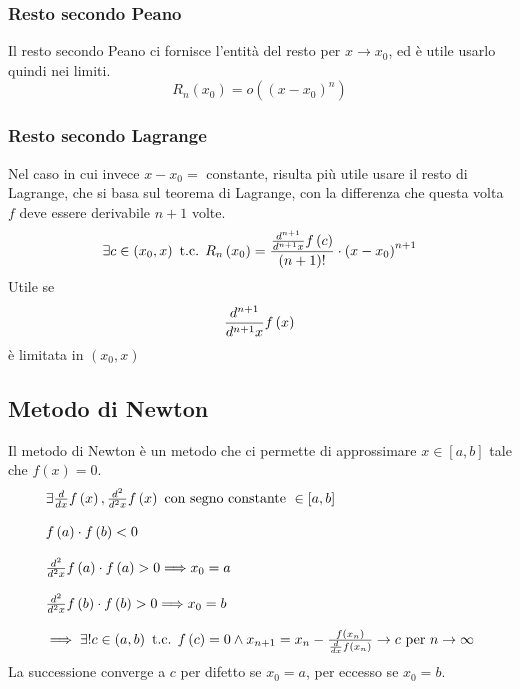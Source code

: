 \documentclass{report}
\begin{document}
        \subsubsection{Resto secondo Peano}
            Il resto secondo Peano ci fornisce l'entità del resto per $x \to x_0$,
            ed è utile usarlo quindi nei limiti.
            $$R_n\left(x_0\right) = o\left(\left(x-x_0\right)^n\right)$$
        \subsubsection{Resto secondo Lagrange}
            Nel caso in cui invece $x - x_0 = $ constante, risulta più utile usare il resto di Lagrange, 
            che si basa sul teorema di Lagrange, con la differenza che questa volta 
            $f$ deve essere derivabile $n+1$ volte. 
            $$\exists c \in \left(x_0, x\right) \textrm{ t.c. } R_n\left(x_0\right) 
                = \frac{\D{x}{n+1}f\left(c\right)}{\left(n+1\right)!} \cdot \left(x - x_0\right)^{n+1}$$
            Utile se $$\D{x}{n+1}f\left(x\right)$$ è limitata in $\left(x_0, x\right)$
    \subsection{Metodo di Newton}
        Il metodo di Newton è un metodo che ci permette di approssimare $x \in \left[a, b\right]$ tale che
        $f\left(x\right) = 0$. 
        $$\begin{array}{l} 
            \exists \D{x}f\left(x\right), \D{x}{2}f\left(x\right) \textrm{ con segno constante } \in \left[a, b\right] \\ \\
            f\left(a\right) \cdot f\left(b\right) < 0  \\ \\
            \D{x}{2}f\left(a\right) \cdot f\left(a\right) > 0 \Longrightarrow x_0 = a \\ \\
            \D{x}{2}f\left(b\right) \cdot f\left(b\right) > 0 \Longrightarrow x_0 = b \\ \\ 
            \implies \exists! c \in \left(a, b\right) \textrm{ t.c. } f\left(c\right) = 0 \wedge x_{n+1} = x_n - \frac{f\left(x_n\right)}{\D{x}f\left(x_n\right)} \to c \textrm{ per } n \to \infty
        \end{array}$$
        La successione converge a $c$ per difetto se $x_0 = a$, per eccesso se $x_0 = b$.
\end{document}
